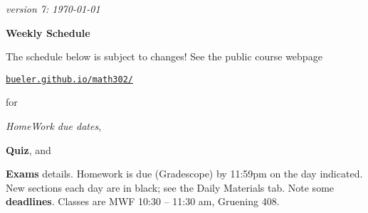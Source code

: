 \documentclass[12pt]{article}
\newcommand{\due}[1]{\strut {\color{BrickRed} \textsl{#1}}}
\newcommand{\ee}[1]{\strut {\color{Blue} \textbf{#1}}}
\newcommand{\dlinline}[1]{{\color{Purple} \textbf{#1}}}
\newcommand{\dl}[1]{{\small \dlinline{#1}}}
\begin{document}
\hfill \small \emph{version 7: \today} \normalsize

\bigskip\bigskip
\centerline{\Large \textbf{Weekly Schedule}}

\bigskip
The schedule below is subject to changes!  See the public course webpage

\medskip

\centerline{\href{https://bueler.github.io/math302/index.html}{\texttt{bueler.github.io/math302/}}}

\noindent for \due{HomeWork due dates}, \ee{Quiz}, and \ee{Exams} details.  Homework is due (Gradescope) by 11:59pm on the day indicated.  New sections each day are in black; see the Daily Materials tab.  Note some \dl{deadlines}.  Classes are MWF 10:30 -- 11:30 am, Gruening 408.

\bigskip
\end{document}
